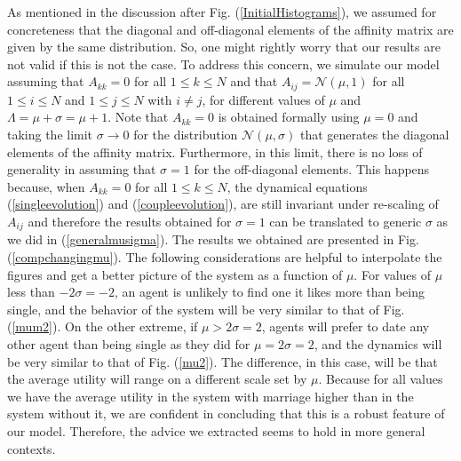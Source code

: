 \documentclass[12pt]{article}
\begin{document}
As mentioned in the discussion after Fig. (\ref{InitialHistograms}), we assumed for concreteness that the diagonal and off-diagonal elements of the affinity matrix are given by the same distribution. So, one might rightly worry that our results are not valid if this is not the case. To address this concern, we simulate our model assuming that $A_{kk}=0$ for all $1\leq k\leq N$ and that $A_{ij}=\mathcal{N}(\mu,1)$ for all $1\leq i\leq N$ and $1\leq j\leq N$ with $i\neq j$, for different values of $\mu$ and $\Lambda=\mu+\sigma=\mu+1$. Note that $A_{kk}=0$ is obtained formally using $\mu=0$ and taking the limit $\sigma\rightarrow0$ for the distribution $\mathcal{N}(\mu,\sigma)$ that generates the diagonal elements of the affinity matrix. Furthermore, in this limit, there is no loss of generality in assuming that $\sigma=1$ for the off-diagonal elements. This happens because, when $A_{kk}=0$ for all $1\leq k\leq N$, the dynamical equations (\ref{singleevolution}) and (\ref{coupleevolution}), are still invariant under re-scaling of $A_{ij}$ and therefore the results obtained for $\sigma=1$ can be translated to generic $\sigma$ as we did in (\ref{generalmusigma}). The results we obtained are presented in Fig. (\ref{compchangingmu}). The following considerations are helpful to interpolate the figures and get a better picture of the system as a function of $\mu$. For values of $\mu$ less than $-2\sigma=-2$, an agent is unlikely to find one it likes more than being single, and the behavior of the system will be very similar to that of Fig. (\ref{mum2}). On the other extreme, if $\mu>2\sigma=2$, agents will prefer to date any other agent than being single as they did for $\mu=2\sigma=2$, and the dynamics will be very similar to that of Fig. (\ref{mu2}). The difference, in this case, will be that the average utility will range on a different scale set by $\mu$. Because for all values we have the average utility in the system with marriage higher than in the system without it, we are confident in concluding that this is a robust feature of our model. Therefore, the advice we extracted seems to hold in more general contexts.
\end{document}
